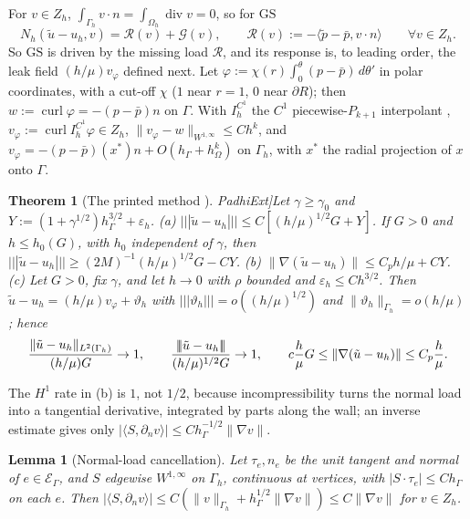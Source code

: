 \documentclass[5p,times]{elsarticle}
\newtheorem{theorem}{Theorem}
\newtheorem{lemma}{Lemma}
\theoremstyle{definition}
\newcommand{\hG}{h_\Gamma}
\newcommand{\hO}{h_\Omega}
\newcommand{\Gh}{\Gamma_h}
\newcommand{\Oh}{\Omega_h}
\newcommand{\EG}{\mathcal E_\Gamma}
\newcommand{\Zh}{Z_h}
\newcommand{\dn}{\partial_n}
\newcommand{\ut}{\tilde u}
\newcommand{\pt}{\tilde p}
\newcommand{\pbar}{\bar p}
\newcommand{\ip}[2]{\langle #1,#2\rangle}
\newcommand{\tnorm}[1]{|\!|\!|#1|\!|\!|}
\newcommand{\norm}[1]{\lVert #1\rVert}
\newcommand{\GS}{\mathrm{GS}}
\newcommand{\eps}{\varepsilon_h}
\newcommand{\Gc}{\mathcal G}
\newcommand{\Rc}{\mathcal R}
\newcommand{\curl}{\operatorname{curl}}
\renewcommand{\div}{\operatorname{div}}
\newcommand{\ext}[1]{\cite[#1]{PadhiExt}}
\begin{document}
For $v\in\Zh$, $\int_{\Gh}v\cdot n=\int_{\Oh}\div v=0$, so for $\GS$
\begin{equation}\label{eq:gserr}
N_h(\ut-u_h,v)=\Rc(v)+\Gc(v),\qquad \Rc(v):=-\ip{\pt-\pbar}{v\cdot n}\qquad\forall v\in\Zh .
\end{equation}
So $\GS$ is driven by the missing load $\Rc$, and its response is, to leading order, the leak field $(h/\mu)v_\varphi$ defined next. Let $\varphi:=\chi(r)\int_0^\theta(p-\pbar)\,d\theta'$ in polar coordinates, with a cut-off $\chi$ ($1$ near $r=1$, $0$ near $\partial R$); then $w:=\curl\varphi=-(p-\pbar)n$ on $\Gamma$. With $I_h^{C^1}$ the $C^1$ piecewise-$P_{k+1}$ interpolant \cite{MorganScott1975}, $v_\varphi:=\curl I_h^{C^1}\varphi\in\Zh$, $\norm{v_\varphi-w}_{W^{1,\infty}}\le Ch^k$, and $v_\varphi=-(p-\pbar)(x^\ast)n+O(\hG+\hO^k)$ on $\Gh$, with $x^\ast$ the radial projection of $x$ onto $\Gamma$.

\begin{theorem}[The printed method \ext{\S6}]\label{thm:gs}
Let $\gamma\ge\gamma_0$ and $Y:=(1+\gamma^{1/2})\hG^{3/2}+\eps$. (a) $\tnorm{\ut-u_h}\le C[(h/\mu)^{1/2}G+Y]$. If $G>0$ and $h\le h_0(G)$, with $h_0$ independent of $\gamma$, then $\tnorm{\ut-u_h}\ge(2M)^{-1}(h/\mu)^{1/2}G-CY$. (b) $\norm{\nabla(\ut-u_h)}\le C_ph/\mu+CY$.
(c) Let $G>0$, fix $\gamma$, and let $h\to0$ with $\rho$ bounded and $\eps\le Ch^{3/2}$. Then $\ut-u_h=(h/\mu)v_\varphi+\vartheta_h$ with $\tnorm{\vartheta_h}=o((h/\mu)^{1/2})$ and $\norm{\vartheta_h}_{\Gh}=o(h/\mu)$; hence
\begin{gather*}
\frac{\norm{\ut-u_h}_{L^2(\Gh)}}{(h/\mu)G}\to1,\qquad \frac{\tnorm{\ut-u_h}}{(h/\mu)^{1/2}G}\to1,\ifdefined\FIVEP\\\else\qquad\fi c\frac h\mu G\le\norm{\nabla(\ut-u_h)}\le C_p\frac h\mu .
\end{gather*}
\end{theorem}

The $H^1$ rate in (b) is $1$, not $1/2$, because incompressibility turns the normal load into a tangential derivative, integrated by parts along the wall; an inverse estimate gives only $|\ip{S}{\dn v}|\le C\hG^{-1/2}\norm{\nabla v}$.

\begin{lemma}[Normal-load cancellation]\label{lem:cancel}
Let $\tau_e,n_e$ be the unit tangent and normal of $e\in\EG$, and $S$ edgewise $W^{1,\infty}$ on $\Gh$, continuous at vertices, with $|S\cdot\tau_e|\le C\hG$ on each $e$. Then $|\ip{S}{\dn v}|\le C(\norm v_{\Gh}+\hG^{1/2}\norm{\nabla v})\le C\norm{\nabla v}$ for $v\in\Zh$.
\end{lemma}
\end{document}
